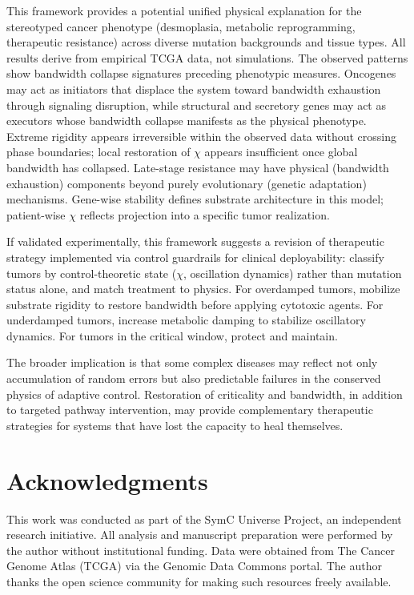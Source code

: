 \documentclass[11pt,letterpaper]{article}
\begin{document}
This framework provides a potential unified physical explanation for the stereotyped cancer phenotype (desmoplasia, metabolic reprogramming, therapeutic resistance) across diverse mutation backgrounds and tissue types. All results derive from empirical TCGA data, not simulations. The observed patterns show bandwidth collapse signatures preceding phenotypic measures. Oncogenes may act as initiators that displace the system toward bandwidth exhaustion through signaling disruption, while structural and secretory genes may act as executors whose bandwidth collapse manifests as the physical phenotype. Extreme rigidity appears irreversible within the observed data without crossing phase boundaries; local restoration of $\chi$ appears insufficient once global bandwidth has collapsed. Late-stage resistance may have physical (bandwidth exhaustion) components beyond purely evolutionary (genetic adaptation) mechanisms. Gene-wise stability defines substrate architecture in this model; patient-wise $\chi$ reflects projection into a specific tumor realization.

If validated experimentally, this framework suggests a revision of therapeutic strategy implemented via control guardrails for clinical deployability: classify tumors by control-theoretic state ($\chi$, oscillation dynamics) rather than mutation status alone, and match treatment to physics. For overdamped tumors, mobilize substrate rigidity to restore bandwidth before applying cytotoxic agents. For underdamped tumors, increase metabolic damping to stabilize oscillatory dynamics. For tumors in the critical window, protect and maintain.

The broader implication is that some complex diseases may reflect not only accumulation of random errors but also predictable failures in the conserved physics of adaptive control. Restoration of criticality and bandwidth, in addition to targeted pathway intervention, may provide complementary therapeutic strategies for systems that have lost the capacity to heal themselves.


\section*{Acknowledgments}

This work was conducted as part of the SymC Universe Project, an independent research initiative. All analysis and manuscript preparation were performed by the author without institutional funding. Data were obtained from The Cancer Genome Atlas (TCGA) via the Genomic Data Commons portal. The author thanks the open science community for making such resources freely available.
\end{document}
